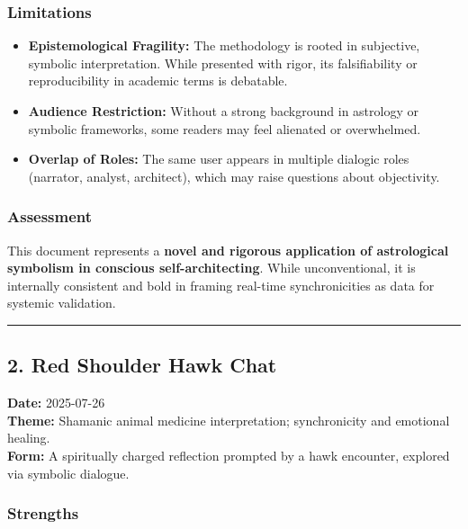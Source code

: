 \documentclass{article}
\begin{document}
\subsubsection*{Limitations}\label{limitations}

\begin{itemize}
\item \textbf{Epistemological Fragility:} The methodology is rooted in subjective, symbolic interpretation. While presented with rigor, its falsifiability or reproducibility in academic terms is debatable.
\item \textbf{Audience Restriction:} Without a strong background in astrology or symbolic frameworks, some readers may feel alienated or overwhelmed.
\item \textbf{Overlap of Roles:} The same user appears in multiple dialogic roles (narrator, analyst, architect), which may raise questions about objectivity.
\end{itemize}

\subsubsection*{Assessment}\label{assessment}

This document represents a \textbf{novel and rigorous application of astrological symbolism in conscious self-architecting}. While unconventional, it is internally consistent and bold in framing real-time synchronicities as data for systemic validation.

\begin{center}\rule{0.5\linewidth}{0.5pt}\end{center}

\subsection*{2. Red Shoulder Hawk Chat}\label{red-shoulder-hawk-chat}

\textbf{Date:} 2025-07-26\\
\textbf{Theme:} Shamanic animal medicine interpretation; synchronicity and emotional healing.\\
\textbf{Form:} A spiritually charged reflection prompted by a hawk encounter, explored via symbolic dialogue.

\subsubsection*{Strengths}\label{strengths-1}
\end{document}
